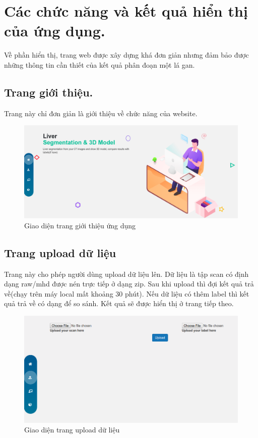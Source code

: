 \section{Các chức năng và kết quả hiển thị của ứng dụng.}
Về phần hiển thị, trang web được xây dựng khá đơn giản nhưng đảm bảo được những thông tin cần thiết của kết quả phân đoạn một lá gan.
\subsection{Trang giới thiệu.}
Trang này chỉ đơn giản là giới thiệu về chức năng của website.
\begin{figure}[h]
\centering
    \includegraphics[totalheight=7cm]{Images/app_intro.png}
    \caption{Giao diện trang giới thiệu ứng dụng}
    \label{skip_conn}
\end{figure}
\subsection{Trang upload dữ liệu}
Trang này cho phép người dùng upload dữ liệu lên. Dữ liệu là tập scan có định dạng raw/mhd được nén trực tiếp ở dạng zip. Sau khi upload thì đợi kết quả trả về(chạy trên máy local mất khoảng 30 phút). Nếu dữ liệu có thêm label thì kết quả trả về có dạng để so sánh. Kết quả sẽ được hiển thị ở trang tiếp theo.
\begin{figure}[h]
\centering
    \includegraphics[totalheight=7cm]{Images/app_upload.png}
    \caption{Giao diện trang upload dữ liệu}
    \label{skip_conn}
\end{figure}
